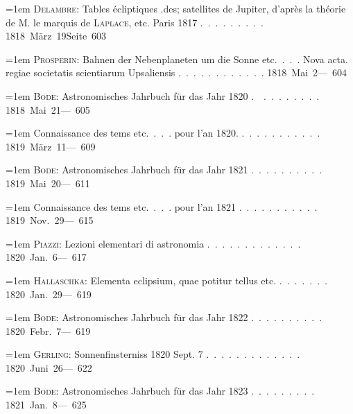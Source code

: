 \clearpage
{}
\begingroup
\raggedright
\noindent\hangindent=1em \textsc{Delambre}: Tables écliptiques .des; satellites de Jupiter, d'après la théorie de M. le marquis de \textsc{Laplace}, etc. Paris 1817 \mbox{.\ .\ .\ .\ .\ .\ .\ .\ .} \hfill\mbox{1818 März 19}\quad\mbox{Seite 603}\par\smallskip
\noindent\hangindent=1em \textsc{Prosperin}: Bahnen der Nebenplaneten um die Sonne etc.\ .\ .\ . Nova acta. regiae societatis scientiarum Upsaliensis \mbox{.\ .\ .\ .\ .\ .\ .\ .\ .\ .\ .\ .} \hfill\mbox{1818 Mai 2}\quad\mbox{--- 604}\par\smallskip
\noindent\hangindent=1em \textsc{Bode}: Astronomisches Jahrbuch für das Jahr 1820 \mbox{.\ \raisebox{.25ex}{-}\ .\ .\ .\ .\ .\ .\ .\ .} \hfill\mbox{1818 Mai 21}\quad\mbox{--- 605}\par\smallskip
\noindent\hangindent=1em Connaissance des tems etc.\ .\ .\ . pour l'an 1820. \mbox{.\ .\ .\ .\ .\ .\ .\ .\ .\ .\ .} \hfill\mbox{1819 März 11}\quad\mbox{--- 609}\par\smallskip
\noindent\hangindent=1em \textsc{Bode}: Astronomisches Jahrbuch für das Jahr 1821 \mbox{.\ .\ .\ .\ .\ .\ .\ .\ .\ .} \hfill\mbox{1819 Mai 20}\quad\mbox{--- 611}\par\smallskip
\noindent\hangindent=1em Connaissance des tems etc.\ .\ .\ . pour l'an 1821 \mbox{.\ .\ .\ .\ .\ .\ .\ .\ .\ .\ .} \hfill\mbox{1819 Nov. 29}\quad\mbox{--- 615}\par\smallskip
\noindent\hangindent=1em \textsc{Piazzi}: Lezioni elementari di astronomia \mbox{.\ .\ .\ .\ .\ .\ .\ .\ .\ .\ .\ .\ .} \hfill\mbox{1820 Jan. 6}\quad\mbox{--- 617}\par\smallskip
\noindent\hangindent=1em \textsc{Hallaschka}: Elementa eclipsium, quae potitur tellus etc. \mbox{.\ .\ .\ .\ .\ .\ .} \hfill\mbox{1820 Jan. 29}\quad\mbox{--- 619}\par\smallskip
\noindent\hangindent=1em \textsc{Bode}: Astronomisches Jahrbuch für das Jahr 1822 \mbox{.\ .\ .\ .\ .\ .\ .\ .\ .\ .} \hfill\mbox{1820 Febr. 7}\quad\mbox{--- 619}\par\smallskip
\noindent\hangindent=1em \textsc{Gerling}: Sonnenfinsterniss 1820 Sept. 7 \mbox{.\ .\ .\ .\ .\ .\ .\ .\ .\ .\ .\ .\ .} \hfill\mbox{1820 Juni 26}\quad\mbox{--- 622}\par\smallskip
\noindent\hangindent=1em \textsc{Bode}: Astronomisches Jahrbuch für das Jahr 1823 \mbox{.\ .\ .\ .\ .\ .\ .\ .\ .} \hfill\mbox{1821 Jan. 8}\quad\mbox{--- 625}\par\smallskip
